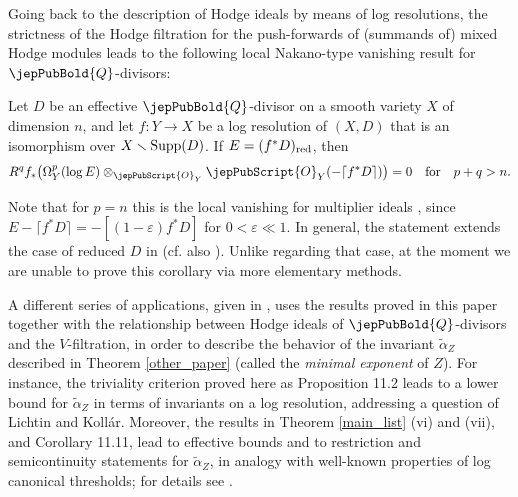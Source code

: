 Going back to the description of Hodge ideals by means of log resolutions, the strictness of the Hodge filtration 
for the push-forwards of (summands of) mixed Hodge modules leads to the following local Nakano-type vanishing 
result for $\jepPubBold{Q}$-divisors:

\begin{intro-corollary}\label{intro_local_vanishing}
Let $D$ be an effective $\jepPubBold{Q}$-divisor on a smooth variety $X$ of dimension $n$, and let $f\colon Y\to X$ be a log resolution of $(X,D)$ that is an isomorphism over
$X\smallsetminus {\rm Supp}(D)$. If $E= (f^*D)_{{\rm red}}$, then
$$R^q f_*\big(\Omega_Y^p(\log E)\otimes_{\jepPubScript{O}_Y} \jepPubScript{O}_Y(-\lceil f^*D\rceil)\big)=0\quad\text{for}\quad p+q>n.$$
\end{intro-corollary}

Note that for $p =n$ this is the local vanishing for multiplier ideals \cite[Th. 9.4.1]{Lazarsfeld}, since $E - \lceil f^*D\rceil = - [(1- \varepsilon) f^*D]$ for $0 < \varepsilon \ll 1$. In general, the statement extends the case of reduced $D$ in \cite[Cor. 3]{Saito-LOG} (cf. also \cite[\S{A.5}]{Saito-MLCT}). Unlike \cite[Th. 32.1]{MP1} regarding that case, at the moment we are unable to prove this corollary via more elementary methods.

A different series of applications, given in \cite{MP3}, uses the results proved in this paper together with the relationship between Hodge ideals of $\jepPubBold{Q}$-divisors and the $V$-filtration, in order to describe the behavior of the invariant $\widetilde{\alpha}_Z$ described in Theorem \ref{other_paper} (called the \emph{minimal exponent} of $Z$). For instance, the triviality criterion proved here as Proposition 11.2 
leads to a lower bound \cite[Cor. ~D]{MP3} for  $\widetilde{\alpha}_Z$ in 
terms of invariants on a log resolution, addressing a question of Lichtin and Koll\'{a}r. Moreover, the results
in Theorem \ref{main_list} (vi) and (vii), and Corollary 11.11, lead to effective bounds and to restriction and semicontinuity statements for $\widetilde{\alpha}_Z$, in analogy with well-known properties of log canonical thresholds; for details see \cite[\S6]{MP3}.




